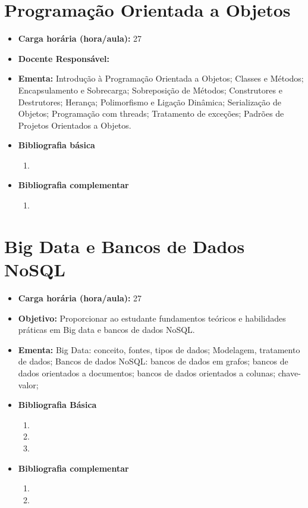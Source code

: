 \documentclass[11pt,fleqn]{book} %
\begin{document}
\section{Programação Orientada a Objetos}\label{3_poo}
\begin{itemize}
	\item \textbf{Carga horária (hora/aula):} 27
	\item \textbf{Docente Responsável:}~
	\item \textbf{Ementa:} 
	Introdução à Programação Orientada a Objetos; 
	Classes e Métodos; 
	Encapsulamento e Sobrecarga; 
	Sobreposição de Métodos; 
	Construtores e Destrutores;
	Herança; 
	Polimorfismo e Ligação Dinâmica; 
	Serialização de Objetos; 
	Programação com threads; 
	Tratamento de exceções;
	Padrões de Projetos Orientados a Objetos.
    
	\item \textbf{Bibliografia básica}
	\begin{enumerate}
		\item 
	\end{enumerate}
	\item \textbf{Bibliografia complementar}
	\begin{enumerate}
		\item 	
	\end{enumerate}	
\end{itemize}



\newpage
\section{Big Data e Bancos de Dados NoSQL}\label{3_nosql}
\begin{itemize}
	\item \textbf{Carga horária (hora/aula):} 27
	\item \textbf{Objetivo:} Proporcionar ao estudante fundamentos teóricos e habilidades práticas em Big data e bancos de dados NoSQL.
	\item \textbf{Ementa:} 
	Big Data: conceito, fontes, tipos de dados;
	Modelagem, tratamento de dados;	
	Bancos de dados NoSQL: bancos de dados em grafos; bancos de dados orientados a documentos; bancos de dados orientados a colunas; chave-valor;
	\item \textbf{Bibliografia Básica}
	\begin{enumerate}
		\item 
		\item 
		\item 
	\end{enumerate}
	\item \textbf{Bibliografia complementar}
	\begin{enumerate}
		\item  
		\item
	\end{enumerate} 	
\end{itemize}
\end{document}
